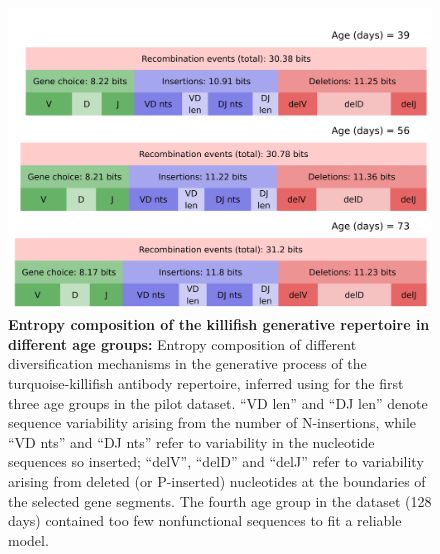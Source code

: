 \begin{figure}
\centering
\includegraphics[width = \textwidth]{_Figures/png/ageing-igor-entropies}
\caption[Entropy composition of the killifish generative repertoire in different age groups]{\textbf{Entropy composition of the killifish generative repertoire in different age groups:} Entropy composition of different diversification mechanisms in the generative process of the turquoise-killifish antibody repertoire, inferred using  for the first three age groups in the \igseq pilot dataset. ``VD len'' and ``DJ len'' denote sequence variability arising from the number of N-insertions, while ``VD nts'' and ``DJ nts'' refer to variability in the nucleotide sequences so inserted; ``delV'', ``delD'' and ``delJ'' refer to variability arising from deleted (or P-inserted) nucleotides at the boundaries of the selected gene segments. The fourth age group in the dataset (128 days) contained too few nonfunctional sequences to fit a reliable model.}
\label{fig:igseq-pilot-igor-entropies}
\end{figure}

